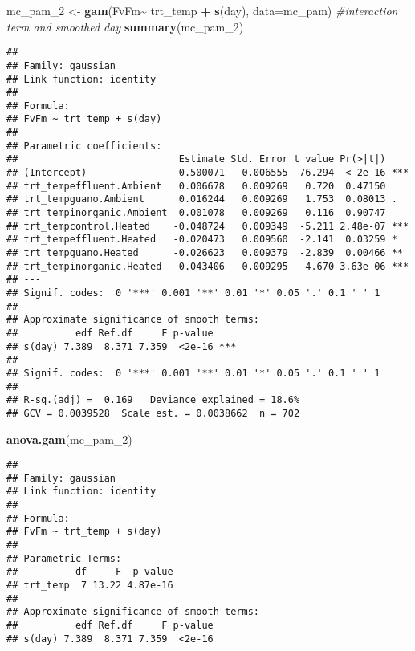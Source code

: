 \documentclass[
]{article}
\newenvironment{Shaded}{\begin{snugshade}}{\end{snugshade}}
\newcommand{\AttributeTok}[1]{\textcolor[rgb]{0.13,0.29,0.53}{#1}}
\newcommand{\CommentTok}[1]{\textcolor[rgb]{0.56,0.35,0.01}{\textit{#1}}}
\newcommand{\FunctionTok}[1]{\textcolor[rgb]{0.13,0.29,0.53}{\textbf{#1}}}
\newcommand{\NormalTok}[1]{#1}
\newcommand{\OtherTok}[1]{\textcolor[rgb]{0.56,0.35,0.01}{#1}}
\newcommand{\SpecialCharTok}[1]{\textcolor[rgb]{0.81,0.36,0.00}{\textbf{#1}}}
\begin{document}
\begin{Shaded}
\begin{Highlighting}[]
\NormalTok{mc\_pam\_2 }\OtherTok{\textless{}{-}} \FunctionTok{gam}\NormalTok{(FvFm}\SpecialCharTok{\textasciitilde{}}\NormalTok{ trt\_temp }\SpecialCharTok{+} \FunctionTok{s}\NormalTok{(day), }\AttributeTok{data=}\NormalTok{mc\_pam) }\CommentTok{\#interaction term and smoothed day}
\FunctionTok{summary}\NormalTok{(mc\_pam\_2)}
\end{Highlighting}
\end{Shaded}

\begin{verbatim}
## 
## Family: gaussian 
## Link function: identity 
## 
## Formula:
## FvFm ~ trt_temp + s(day)
## 
## Parametric coefficients:
##                            Estimate Std. Error t value Pr(>|t|)    
## (Intercept)                0.500071   0.006555  76.294  < 2e-16 ***
## trt_tempeffluent.Ambient   0.006678   0.009269   0.720  0.47150    
## trt_tempguano.Ambient      0.016244   0.009269   1.753  0.08013 .  
## trt_tempinorganic.Ambient  0.001078   0.009269   0.116  0.90747    
## trt_tempcontrol.Heated    -0.048724   0.009349  -5.211 2.48e-07 ***
## trt_tempeffluent.Heated   -0.020473   0.009560  -2.141  0.03259 *  
## trt_tempguano.Heated      -0.026623   0.009379  -2.839  0.00466 ** 
## trt_tempinorganic.Heated  -0.043406   0.009295  -4.670 3.63e-06 ***
## ---
## Signif. codes:  0 '***' 0.001 '**' 0.01 '*' 0.05 '.' 0.1 ' ' 1
## 
## Approximate significance of smooth terms:
##          edf Ref.df     F p-value    
## s(day) 7.389  8.371 7.359  <2e-16 ***
## ---
## Signif. codes:  0 '***' 0.001 '**' 0.01 '*' 0.05 '.' 0.1 ' ' 1
## 
## R-sq.(adj) =  0.169   Deviance explained = 18.6%
## GCV = 0.0039528  Scale est. = 0.0038662  n = 702
\end{verbatim}

\begin{Shaded}
\begin{Highlighting}[]
\FunctionTok{anova.gam}\NormalTok{(mc\_pam\_2)}
\end{Highlighting}
\end{Shaded}

\begin{verbatim}
## 
## Family: gaussian 
## Link function: identity 
## 
## Formula:
## FvFm ~ trt_temp + s(day)
## 
## Parametric Terms:
##          df     F  p-value
## trt_temp  7 13.22 4.87e-16
## 
## Approximate significance of smooth terms:
##          edf Ref.df     F p-value
## s(day) 7.389  8.371 7.359  <2e-16
\end{verbatim}
\end{document}
